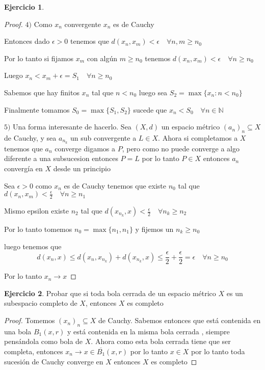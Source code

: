 \documentclass[12pt]{article}
\newcommand{\N}{\mathbb{N}}
\newcommand{\ra}{\rightarrow}
\newcommand{\ol}{\overline}
\theoremstyle{definition}
\newtheorem{ej}{Ejercicio}
\begin{document}
\begin{ej}
\begin{proof}
$4)$ Como $x_n$ convergente $x_n$ es de Cauchy 

Entonces dado $\epsilon > 0 $ tenemos que $d(x_n,x_m) < \epsilon \quad \forall n,m \geq n_0$ 

Por lo tanto si fijamos $x_m$ con algún $m \geq n_0$ tenemos $d(x_n,x_m) < \epsilon \quad \forall n \geq n_0$ 

Luego $x_n < x_m + \epsilon = S_1 \quad \forall n \geq n_0$ 

Sabemos que hay finitos $x_n$ tal que $n < n_0$ luego sea $S_2 = \max \{x_n : n < n_0\}$ 

Finalmente tomamos $S_0 = \max \{S_1,S_2\}$ sucede que $x_n < S_0 \quad \forall n \in \N$ 

$5)$ Una forma interesante de hacerlo. Sea $(X,d)$ un espacio métrico $(a_n)_n \subseteq X$ de Cauchy, y sea $a_{n_k}$ un sub convergente a $L \in X$. Ahora si completamos a $X$ tenemos que $a_n$ converge digamos a $P$, pero como no puede converge a algo diferente a una subsucesion entonces $P = L$ por lo tanto $P \in X$ entonces $a_n$ convergía en $X$ desde un principio

Sea $\epsilon > 0$ como $x_n$ es de Cauchy tenemos que existe $n_0$ tal que $d(x_n,x_m) < \frac{\epsilon}{2} \quad \forall n \geq n_1$

Mismo epsilon existe $n_2$ tal que $d(x_{n_k},x) < \frac{\epsilon}{2} \quad \forall n_k \geq n_2$

Por lo tanto tomemos $n_0 = \max \{n_1,n_1\}$ y fijemos un $n_k \geq n_0$

luego tenemos que $$d(x_n,x) \leq d(x_n,x_{n_k}) + d(x_{n_k},x) \leq \frac{\epsilon}{2} + \frac{\epsilon}{2} = \epsilon \quad \forall n \geq n_0$$

Por lo tanto $x_n \ra x$
  \end{proof}
\end{ej}
\begin{ej}
  Probar que si toda bola cerrada de un espacio métrico $X$ es un subespacio completo de $X$, entonces $X$ es completo
  \begin{proof}
    Tomemos $(x_n)_n \subseteq X$ de Cauchy. Sabemos entonces que está contenida en una bola $B_1(x,r)$ y está contenida en la misma bola cerrada , siempre pensándola como bola de $X$. Ahora como esta bola cerrada tiene que ser completa, entonces $x_n \ra x \in \ol{B_1}(x,r)$ por lo tanto $x \in X$ por lo tanto toda sucesión de Cauchy converge en $X$ entonces $X$ es completo  
  \end{proof}
\end{ej}
\end{document}
